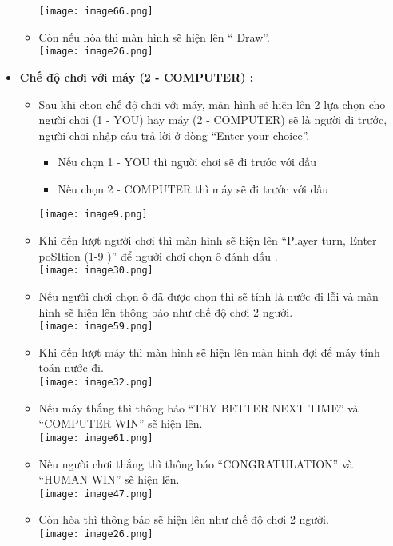 \begin{itemize}
\begin{itemize}
        \texttt{[image: image66.png]}
        \item Còn nếu hòa thì màn hình sẽ hiện lên “ Draw”.\\
        \texttt{[image: image26.png]}
    \end{itemize}
    \item \textbf{Chế độ chơi với máy (2 - COMPUTER) :}
    \begin{itemize}
        \item Sau khi chọn chế độ chơi với máy, màn hình sẽ hiện lên 2 lựa chọn cho người chơi (1 - YOU) hay máy (2 - COMPUTER) sẽ là người đi trước, người chơi nhập câu trả lời ở dòng “Enter your choice”.
        \begin{itemize}
            \item Nếu chọn 1 - YOU thì người chơi sẽ đi trước với dấu 
            \item Nếu chọn 2 - COMPUTER thì máy sẽ đi trước với dấu \\
        \end{itemize}
        \texttt{[image: image9.png]}
        \item Khi đến lượt người chơi thì màn hình sẽ hiện lên “Player turn, Enter poSItion (1-9 )” để người chơi chọn ô đánh dấu .\\
        \texttt{[image: image30.png]}
        \item Nếu người chơi chọn ô đã được chọn thì sẽ tính là nước đi lỗi và màn hình sẽ hiện lên thông báo như chế độ chơi 2 người.\\
        \texttt{[image: image59.png]}
        \item Khi đến lượt máy thì màn hình sẽ hiện lên màn hình đợi để máy tính toán nước đi.\\
        \texttt{[image: image32.png]}
        \item Nếu máy thắng thì thông báo “TRY BETTER NEXT TIME” và “COMPUTER WIN” sẽ hiện lên.\\
        \texttt{[image: image61.png]}
        \item Nếu người chơi thắng thì thông báo “CONGRATULATION” và “HUMAN WIN” sẽ hiện lên.\\
        \texttt{[image: image47.png]}
        \item Còn hòa thì thông báo sẽ hiện lên như chế độ chơi 2 người.\\
        \texttt{[image: image26.png]}
    \end{itemize}
\end{itemize}


